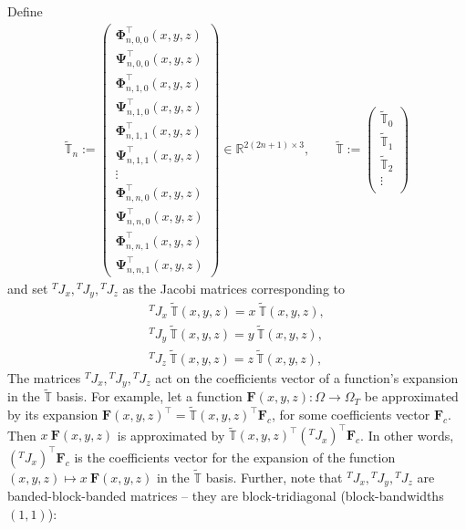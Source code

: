 \documentclass[11pt, oneside]{article}   	%
\newcommand{\R}{\mathbb{R}}
\newcommand{\tangentspace}{{\Omega_T}}
\newcommand{\bigtsop}{\mathbb{T}}
\newcommand{\bigtsopt}{\tilde{\bigtsop}}
\newcommand{\bigtsoptn}{\bigtsopt_n}
\newcommand{\tsopi}{\bm{\Phi}}
\newcommand{\tsopii}{\bm{\Psi}}
\newcommand{\tsopit}{\tsopi^\top}
\newcommand{\tsopiit}{\tsopii^\top}
\newcommand{\jacobimattangent}{{}^T\!J}
\newcommand{\jacobimattangentx}{\jacobimattangent_x}
\newcommand{\jacobimattangenty}{\jacobimattangent_y}
\newcommand{\jacobimattangentz}{\jacobimattangent_z}
\begin{document}
Define
\begin{align*}
	\bigtsoptn := 
		\begin{pmatrix}
			\tsopit_{n,0,0}(x,y,z) \\
			\tsopiit_{n,0,0}(x,y,z) \\
			\tsopit_{n,1,0}(x,y,z) \\
			\tsopiit_{n,1,0}(x,y,z) \\
			\tsopit_{n,1,1}(x,y,z) \\
			\tsopiit_{n,1,1}(x,y,z) \\
			\vdots \\
			\tsopit_{n,n,0}(x,y,z) \\
			\tsopiit_{n,n,0}(x,y,z) \\
			\tsopit_{n,n,1}(x,y,z) \\
			\tsopiit_{n,n,1}(x,y,z)
		\end{pmatrix} \in \R^{2(2n+1) \times 3}, 
	\quad \quad 
	\bigtsopt := 
		\begin{pmatrix}
			\bigtsopt_0 \\
			\bigtsopt_1 \\
			\bigtsopt_2 \\
			\vdots \\
		\end{pmatrix}
\end{align*}
and set $\jacobimattangentx, \jacobimattangenty, \jacobimattangentz$ as the Jacobi matrices corresponding to
\begin{align}
	\jacobimattangentx \: \bigtsopt(x,y,z) = x \: \bigtsopt(x,y,z), \nonumber \\
	\jacobimattangenty \: \bigtsopt(x,y,z) = y \: \bigtsopt(x,y,z), \label{eqn:jacobimatricestangentdefinition} \\
	\jacobimattangentz \: \bigtsopt(x,y,z) = z \: \bigtsopt(x,y,z), \nonumber
\end{align}
The matrices $\jacobimattangentx, \jacobimattangenty, \jacobimattangentz$ act on the coefficients vector of a function's expansion in the $\bigtsopt$ basis. For example, let a function $\bm{F}(x,y,z) : \Omega \to \tangentspace$ be approximated by its expansion $\bm{F}(x,y,z)^\top = \bigtsopt(x,y,z)^\top \bm{F}_c$, for some coefficients vector $\bm{F}_c$. Then $x \: \bm{F}(x,y,z)$ is approximated by $\bigtsopt(x,y,z)^\top {(\jacobimattangentx)}^\top \bm{F}_c$. In other words, ${(\jacobimattangentx)}^\top \bm{F}_c$ is the coefficients vector for the expansion of the function $(x,y,z) \mapsto x \: \bm{F}(x,y,z)$ in the  $\bigtsopt$ basis. Further, note that $\jacobimattangentx, \jacobimattangenty, \jacobimattangentz$ are banded-block-banded matrices -- they are block-tridiagonal (block-bandwidths $(1,1)$):
\end{document}
